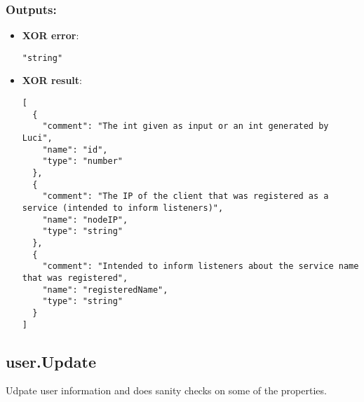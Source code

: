 \subsubsection*{Outputs:}
\begin{itemize}
    \item \textbf{XOR error}: 
\begin{lstlisting}
"string"
\end{lstlisting}
    \item \textbf{XOR result}: 
\begin{lstlisting}
[
  {
    "comment": "The int given as input or an int generated by Luci", 
    "name": "id", 
    "type": "number"
  }, 
  {
    "comment": "The IP of the client that was registered as a service (intended to inform listeners)", 
    "name": "nodeIP", 
    "type": "string"
  }, 
  {
    "comment": "Intended to inform listeners about the service name that was registered", 
    "name": "registeredName", 
    "type": "string"
  }
]
\end{lstlisting}
  \end{itemize}

\subsection{user.Update}
Udpate user information and does sanity checks on some of the properties.
